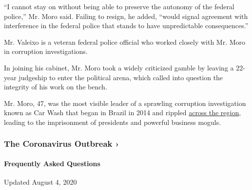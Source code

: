 ``I cannot stay on without being able to preserve the autonomy of the
federal police,'' Mr. Moro said. Failing to resign, he added, ``would
signal agreement with interference in the federal police that stands to
have unpredictable consequences.''

Mr. Valeixo is a veteran federal police official who worked closely with
Mr. Moro in corruption investigations.

In joining his cabinet, Mr. Moro took a widely criticized gamble by
leaving a 22-year judgeship to enter the political arena, which called
into question the integrity of his work on the bench.

Mr. Moro, 47, was the most visible leader of a sprawling corruption
investigation known as Car Wash that began in Brazil in 2014 and rippled
\href{https://www.nytimes3xbfgragh.onion/2017/02/13/world/americas/peru-colombia-venezuela-brazil-odebrecht-scandal.html}{across
the region}, leading to the imprisonment of presidents and powerful
business moguls.

\href{https://www.nytimes3xbfgragh.onion/news-event/coronavirus?action=click\&pgtype=Article\&state=default\&region=MAIN_CONTENT_3\&context=storylines_faq}{}

\hypertarget{the-coronavirus-outbreak-}{%
\subsubsection{The Coronavirus Outbreak
›}\label{the-coronavirus-outbreak-}}

\hypertarget{frequently-asked-questions}{%
\paragraph{Frequently Asked
Questions}\label{frequently-asked-questions}}

Updated August 4, 2020

